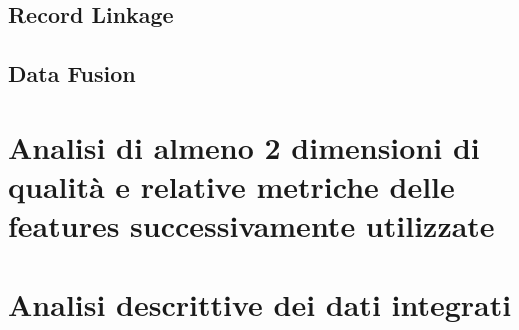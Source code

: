 \section{Record Linkage}
\label{sec:record-linkage}

\section{Data Fusion}

\chapter{Analisi di almeno 2 dimensioni di qualità e relative metriche delle features successivamente utilizzate}

\chapter{Analisi descrittive dei dati integrati}
